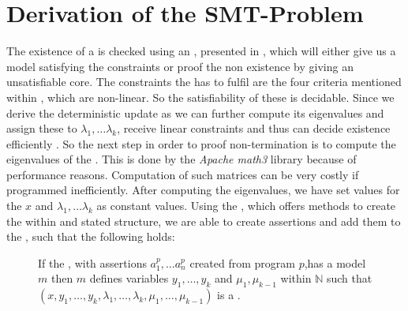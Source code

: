 \section{Derivation of the SMT-Problem}
\label{sec:derivation-smt}
The existence of a \gna is checked using an \solver, presented in , which will either give us a model satisfying the constraints or proof the non existence by giving an unsatisfiable core. \newline
The constraints the \solver has to fulfil are the four criteria mentioned within , which are non-linear. So the satisfiability of these is decidable. Since we derive the deterministic update as \updatematrix we can further compute its eigenvalues and assign these to $\lambda_1, \dots \lambda_k$, receive linear constraints and thus can decide existence efficiently \cite{leike2014geometric}.%
\newline
So the next step in order to proof non-termination is to compute the eigenvalues of the \updatematrix. This is done by the \textit{Apache math3} library \cite{ApacheMath3} because of performance reasons. Computation of such matrices can be very costly if programmed inefficiently. %
After computing the eigenvalues, we have set values for the \stem $x$ and $\lambda_1, \dots \lambda_k$ as constant values.
\newline
Using the \smtfactory, which offers methods to create the within  and  stated structure, we are able to create assertions and add them to the \solver, such that the following holds:
\begin{figure}[H]
	\centering
	If the \solver, with assertions $a^p_1, \dots a^p_n$ created from program $p$,has a model $m$ \newline
	then $m$ defines variables $y_1, \dots, y_k$ and $\mu_1, \mu_{k-1}$ within $\mathbb{N}$ such that \newline
	$(x, y_1, \dots, y_k, \lambda_1, \dots, \lambda_k, \mu_1, \dots, \mu_{k-1})$ is a \gna.
\end{figure}

